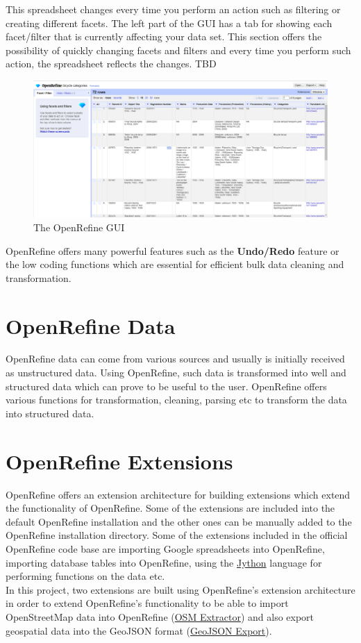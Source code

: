 This spreadsheet changes every time you perform an action such as filtering or creating different facets.
The left part of the GUI has a tab for showing each facet/filter that is currently affecting your data set.
This section offers the possibility of quickly changing facets and filters and every time you perform such action,
the spreadsheet reflects the changes. TBD
\begin{figure}[H]
    \includegraphics[width=\linewidth]{./Figures/OpenRefine/openrefine_gui.png}
    \caption{The OpenRefine GUI}
\end{figure}
OpenRefine offers many powerful features such as the \textbf{Undo/Redo} feature or the low coding functions which are essential for efficient bulk data cleaning and transformation.
\newpage
\section{OpenRefine Data}
OpenRefine data can come from various sources and usually is initially received as unstructured data. Using OpenRefine, such data is transformed
into well and structured data which can prove to be useful to the user. OpenRefine offers various functions for transformation, cleaning, parsing etc to
transform the data into structured data.
\section{OpenRefine Extensions}
OpenRefine offers an extension architecture for building extensions which extend the functionality of OpenRefine. Some of the extensions are included
into the default OpenRefine installation and the other ones can be manually added to the OpenRefine installation directory. Some of the extensions included
in the official OpenRefine code base are importing Google spreadsheets into OpenRefine, importing database tables into OpenRefine, using the \href{https://www.jython.org/}{Jython}
language for performing functions on the data etc.\\
\newline
In this project, two extensions are built using OpenRefine's extension architecture in order to extend OpenRefine's functionality to
be able to import OpenStreetMap data into OpenRefine (\hyperref[ch:the-osm-extractor-extension]{OSM Extractor}) and also export geospatial
data into the GeoJSON format (\hyperref[ch:the-geojson-export-extension]{GeoJSON Export}).
